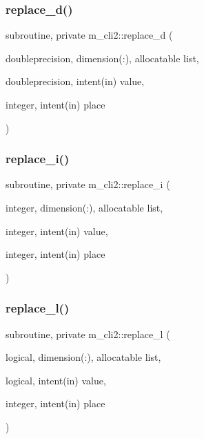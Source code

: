 \subsubsection{\texorpdfstring{replace\+\_\+d()}{replace\_d()}}
{\footnotesize\ttfamily subroutine, private m\+\_\+cli2\+::replace\+\_\+d (\begin{DoxyParamCaption}\item[{doubleprecision, dimension(\+:), allocatable}]{list,  }\item[{doubleprecision, intent(in)}]{value,  }\item[{integer, intent(in)}]{place }\end{DoxyParamCaption})\hspace{0.3cm}{\ttfamily [private]}}

\mbox{\label{namespacem__cli2_a0a591fd55e8010f26eb6f9f6bafc1ddb}} 
\subsubsection{\texorpdfstring{replace\+\_\+i()}{replace\_i()}}
{\footnotesize\ttfamily subroutine, private m\+\_\+cli2\+::replace\+\_\+i (\begin{DoxyParamCaption}\item[{integer, dimension(\+:), allocatable}]{list,  }\item[{integer, intent(in)}]{value,  }\item[{integer, intent(in)}]{place }\end{DoxyParamCaption})\hspace{0.3cm}{\ttfamily [private]}}

\mbox{\label{namespacem__cli2_ae4a1802207f6b67e36cbf89003d6fb55}} 
\subsubsection{\texorpdfstring{replace\+\_\+l()}{replace\_l()}}
{\footnotesize\ttfamily subroutine, private m\+\_\+cli2\+::replace\+\_\+l (\begin{DoxyParamCaption}\item[{logical, dimension(\+:), allocatable}]{list,  }\item[{logical, intent(in)}]{value,  }\item[{integer, intent(in)}]{place }\end{DoxyParamCaption})\hspace{0.3cm}{\ttfamily [private]}}

